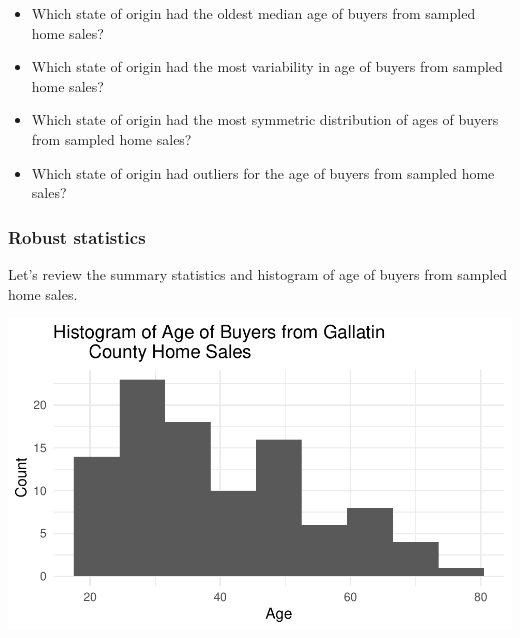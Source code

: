 \documentclass[
]{report}
\providecommand{\tightlist}{%
  \setlength{\itemsep}{0pt}\setlength{\parskip}{0pt}}
\begin{document}
\begin{itemize}
\tightlist
\item
  Which state of origin had the oldest median age of buyers from sampled home sales?
\end{itemize}

\vspace{0.3in}

\begin{itemize}
\tightlist
\item
  Which state of origin had the most variability in age of buyers from sampled home sales?
\end{itemize}

\vspace{0.3in}

\begin{itemize}
\tightlist
\item
  Which state of origin had the most symmetric distribution of ages of buyers from sampled home sales?
\end{itemize}

\vspace{0.3in}

\begin{itemize}
\tightlist
\item
  Which state of origin had outliers for the age of buyers from sampled home sales?
\end{itemize}

\vspace{0.3in}

\newpage

\hypertarget{robust-statistics}{%
\subsubsection*{Robust statistics}\label{robust-statistics}}

Let's review the summary statistics and histogram of age of buyers from sampled home sales.

\begin{center}\includegraphics[width=0.85\linewidth]{03-LN03-EDA_files/figure-latex/unnamed-chunk-21-1} \end{center}
\end{document}
